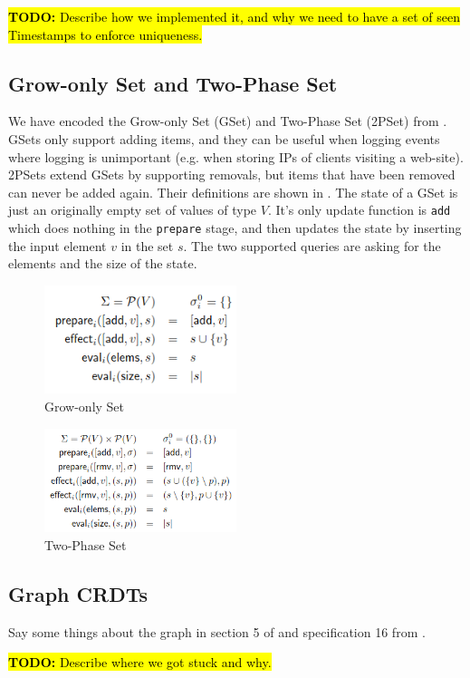 \documentclass{article}
\newcommand{\TODO}[1]{\hl{\textbf{TODO:} #1}\xspace}
\begin{document}
\TODO{Describe how we implemented it, and why we need to have a set of seen Timestamps to enforce uniqueness.}

\subsection{Grow-only Set and Two-Phase Set}

We have encoded the Grow-only Set (GSet) and Two-Phase Set (2PSet)
from \cite{baquero2017pure}. GSets only support adding items, and they
can be useful when logging events where logging is unimportant
(e.g. when storing IPs of clients visiting a web-site). 2PSets extend
GSets by supporting removals, but items that have been removed can
never be added again. Their definitions are shown in
. The state of a GSet is just an
originally empty set of values of type $V$. It's only update function
is \texttt{add} which does nothing in the \texttt{prepare} stage, and
then updates the state by inserting the input element $v$ in the set
$s$. The two supported queries are asking for the elements and the
size of the state.

\begin{figure}[h]
    \centering
    \includegraphics[width=0.5\textwidth]{grow-only-set-definition}
    \caption{Grow-only Set}
    \label{fig:gset-def}
\end{figure}

\begin{figure}[h]
    \centering
    \includegraphics[width=0.5\textwidth]{2pset-definition}
    \caption{Two-Phase Set}
    \label{fig:2pset-def}
\end{figure}

\subsection{Graph CRDTs}

Say some things about the graph in section 5 of
\cite{shapiro2011conflict} and specification 16 from
\cite{shapiro2011comprehensive}.

\TODO{Describe where we got stuck and why.}



\end{document}
